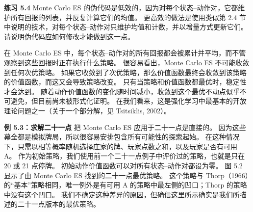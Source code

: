 \documentclass[UTF8,12pt,a4paper,fontset=fandol]{ctexart}
\begin{document}
\begin{center}
\end{center}

\noindent\textbf{练习 5.4}
Monte Carlo ES 的伪代码是低效的，因为对每个状态--动作对，它都维护所有回报的列表，并反复计算它们的均值。
更高效的做法是使用类似第 2.4 节中说明的技术，对每个状态--动作对只维护均值和计数，并以增量方式更新它们。
请说明伪代码应如何修改才能做到这一点。

在 Monte Carlo ES 中，每个状态--动作对的所有回报都会被累计并平均，而不管观察到这些回报时正在执行什么策略。
很容易看出，Monte Carlo ES 不可能收敛到任何次优策略。
如果它收敛到了次优策略，那么价值函数最终会收敛到该策略的价值函数，而这又会导致策略改变。
只有当策略和价值函数都最优时，稳定性才会达到。
随着动作价值函数的变化随时间减小，收敛到这个最优不动点似乎不可避免，但目前尚未被形式化证明。
在我们看来，这是强化学习中最基本的开放理论问题之一（关于一个部分解，见 Tsitsiklis, 2002）。

\noindent\textbf{例 5.3：求解二十一点}
把 Monte Carlo ES 应用于二十一点是直接的。
因为这些幕全都是模拟牌局，所以很容易安排包含所有可能性的探索起始。
在这种情况下，只需以相等概率随机选择庄家的牌、玩家点数之和，以及玩家是否有可用 A。
作为初始策略，我们使用前一个二十一点例子中评价过的策略，也就是只在 20 或 21 点停牌。
初始动作价值函数可以对所有状态--动作对都设为零。
图 5.2 显示了由 Monte Carlo ES 找到的二十一点最优策略。
这个策略与 Thorp（1966）的“基本”策略相同，唯一例外是有可用 A 的策略中最左侧的凹口；Thorp 的策略中没有这个凹口。
我们不确定这种差异的原因，但确信这里所示确实是我们所描述的二十一点版本的最优策略。
\end{document}

